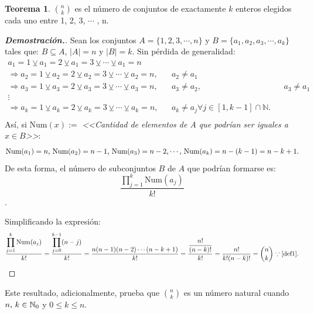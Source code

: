 \documentclass{article}
\theoremstyle{definition}
\newtheorem{teor}{Teorema}
\begin{document}
\begin{teor}
$\binom{n}{k}$ es el número de conjuntos de exactamente $k$ enteros elegidos cada uno entre 1, 2, 3, $\cdots$ , n.
\end{teor}
\begin{proof}[\textbf{{Demostración.}}]
Sean los conjuntos $A=\{1, 2, 3, \cdots , n\}$ y $B=\{a_{1}, a_{2}, a_{3}, \cdots , a_{k}\}$ tales que: $B\subseteq A$, $|A|=n$ y $|B|=k$.
Sin pérdida de generalidad: 
\begin{align*}
    a_{1}=1 \veebar a_{1}=2 \veebar a_{1}=3 \veebar \cdots \veebar a_{1}=n\\
      \Rightarrow  a_{2}=1 \veebar a_{2}=2 \veebar a_{2}=3 \veebar \cdots \veebar a_{2}=n,  &&a_{2}\neq a_{1}\\
       \Rightarrow     a_{3}=1 \veebar a_{3}=2 \veebar a_{3}=3 \veebar \cdots \veebar a_{3}=n,  &&a_{3}\neq a_{2}, && a_{3}\neq a_{1}\\
          \vdots\\
          \Rightarrow  a_{k}=1 \veebar a_{k}=2 \veebar a_{k}=3 \veebar \cdots \veebar a_{k}=n,  &&a_{k}\neq a_{j} \forall j \in [1,k-1] \cap \mathbb{N}.\\
\end{align*}
Así, si $\mathrm{Num}(x):=$ \textit{<<Cantidad de elementos de A que podrían ser iguales a $x \in B$>>}:
$$\mathrm{Num}(a_{1})=n\textnormal{, }  \mathrm{Num}(a_{2})=n-1\textnormal{, }  \mathrm{Num}(a_{3})=n-2\textnormal{,} \cdots \textnormal{, }  \mathrm{Num}(a_{k})=n-(k-1)=n-k+1. $$
De esta forma, el número de subconjuntos $B$ de $A$ que podrían formarse es:
$$\dfrac{\displaystyle \prod_{j=1}^{k} \mathrm{Num}(a_{j})}{k!}$$.

Simplificando la expresión:
$$\dfrac{\displaystyle \prod_{j=1}^{k} \mathrm{Num}(a_{j})}{k!}=\dfrac{\displaystyle \prod_{j=0}^{k-1}(n-j)}{k!}=\dfrac{n(n-1)(n-2)\cdots (n-k+1)}{k!}=\dfrac{\dfrac{n!}{(n-k)!}}{k!}=\dfrac{n!}{k!(n-k)!}= \displaystyle \binom{n}{k} \because \ref{def1}.$$
\end{proof}
Este resultado, adicionalmente, prueba que $\binom{n}{k}$ es un número natural cuando $n \textnormal{, } k \in \mathbb{N}_{0}$ y $0 \leq k \leq n$.
\end{document}
